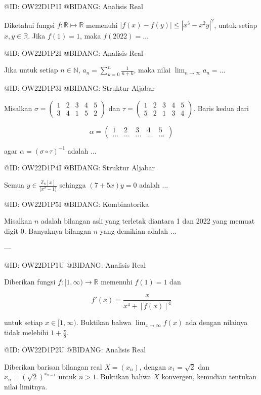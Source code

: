 
@ID: OW22D1P1I
@BIDANG: Analisis Real

Diketahui fungsi $f : \mathbb{R} \mapsto \mathbb{R}$ memenuhi $|f(x) - f(y)| \le |x^3 - x^2y|^2$, untuk setiap $x, y \in \mathbb{R}$. Jika $f(1) = 1$, maka $f(2022) = \ldots$

@ID: OW22D1P2I
@BIDANG: Analisis Real

Jika untuk setiap $n \in \mathbb{N}$, $a_n = \sum_{k=0}^{n} \frac{1}{n+k}$, maka nilai $\lim_{n \to \infty} a_n = \ldots$

@ID: OW22D1P3I
@BIDANG: Struktur Aljabar

Misalkan $\sigma = \begin{pmatrix} 1 & 2 & 3 & 4 & 5 \\ 3 & 4 & 1 & 5 & 2 \end{pmatrix}$ dan $\tau = \begin{pmatrix} 1 & 2 & 3 & 4 & 5 \\ 5 & 2 & 1 & 3 & 4 \end{pmatrix}$. Baris kedua dari 

$$
\alpha = \begin{pmatrix} 1 & 2 & 3 & 4 & 5 \\ \ldots & \ldots & \ldots & \ldots & \ldots \end{pmatrix}
$$

agar $\alpha = (\sigma \circ \tau)^{-1}$ adalah $\ldots$

@ID: OW22D1P4I
@BIDANG: Struktur Aljabar

Semua $y \in \frac{\mathbb{Z}_8[x]}{\langle x^2 - 1 \rangle}$ sehingga $(7 + 5x)y = 0$ adalah $\ldots$

@ID: OW22D1P5I
@BIDANG: Kombinatorika

Misalkan $n$ adalah bilangan asli yang terletak diantara 1 dan 2022 yang memuat digit 0. Banyaknya bilangan $n$ yang demikian adalah $\ldots$

---

@ID: OW22D1P1U
@BIDANG: Analisis Real

Diberikan fungsi $f : [1, \infty) \to \mathbb{R}$ memenuhi $f(1) = 1$ dan 

$$
f'(x) = \frac{x}{x^4 + [f(x)]^4}
$$

untuk setiap $x \in [1, \infty)$. Buktikan bahwa $\lim_{x \to \infty} f(x)$ ada dengan nilainya tidak melebihi $1 + \frac{\pi}{8}$.

@ID: OW22D1P2U
@BIDANG: Analisis Real

Diberikan barisan bilangan real $X = (x_n)$, dengan $x_1 = \sqrt{2}$ dan $x_n = (\sqrt{2})^{x_{n-1}}$ untuk $n > 1$. Buktikan bahwa $X$ konvergen, kemudian tentukan nilai limitnya.

